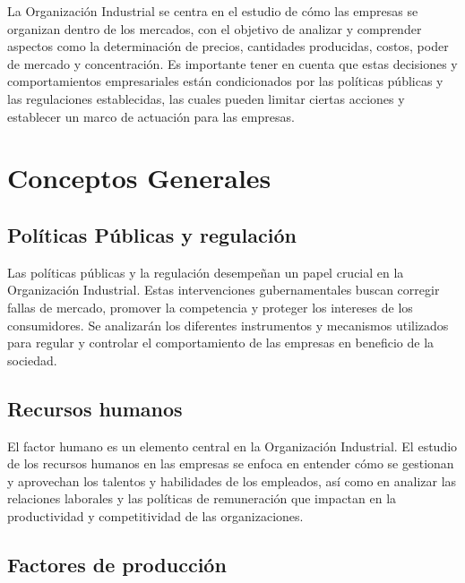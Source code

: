 \documentclass[
  a4paper,
]{article}
\begin{document}
La Organización Industrial se centra en el estudio de cómo las empresas
se organizan dentro de los mercados, con el objetivo de analizar y
comprender aspectos como la determinación de precios, cantidades
producidas, costos, poder de mercado y concentración. Es importante
tener en cuenta que estas decisiones y comportamientos empresariales
están condicionados por las políticas públicas y las regulaciones
establecidas, las cuales pueden limitar ciertas acciones y establecer un
marco de actuación para las empresas.

\hypertarget{conceptos-generales}{%
\section{Conceptos Generales}\label{conceptos-generales}}

\hypertarget{poluxedticas-puxfablicas-y-regulaciuxf3n}{%
\subsection{Políticas Públicas y
regulación}\label{poluxedticas-puxfablicas-y-regulaciuxf3n}}

Las políticas públicas y la regulación desempeñan un papel crucial en la
Organización Industrial. Estas intervenciones gubernamentales buscan
corregir fallas de mercado, promover la competencia y proteger los
intereses de los consumidores. Se analizarán los diferentes instrumentos
y mecanismos utilizados para regular y controlar el comportamiento de
las empresas en beneficio de la sociedad.

\hypertarget{recursos-humanos}{%
\subsection{Recursos humanos}\label{recursos-humanos}}

El factor humano es un elemento central en la Organización Industrial.
El estudio de los recursos humanos en las empresas se enfoca en entender
cómo se gestionan y aprovechan los talentos y habilidades de los
empleados, así como en analizar las relaciones laborales y las políticas
de remuneración que impactan en la productividad y competitividad de las
organizaciones.

\hypertarget{factores-de-producciuxf3n}{%
\subsection{Factores de producción}\label{factores-de-producciuxf3n}}
\end{document}
